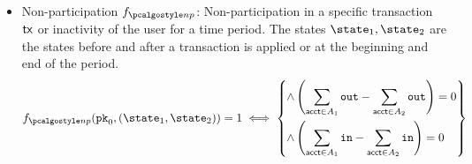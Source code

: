 \begin{itemize}
        \item Non-participation $f_{\nonpart}$: Non-participation in a specific transaction $\textup{\textsf{tx}}$ or inactivity of the user for a time period. The states $\snap_1, \snap_2$ are the states before and after a transaction is applied or at the beginning and end of the period.
        \begin{align*}
            f_{\nonpart}(\inpk, (\snap_1, \snap_2)) = 1 \iff  
            \left\{ 
                \begin{aligned} 
                    \land & \left(\sum_{\acct \in A_{1}}\varout - \sum_{\acct \in A_{2}}\varout \right) = 0 \\
                    \land &\left(\sum_{\acct \in A_{1}}\varin - \sum_{\acct \in A_{2}}\varin \right) = 0
                \end{aligned} 
            \right\}
        \end{align*}

         
\end{itemize}

